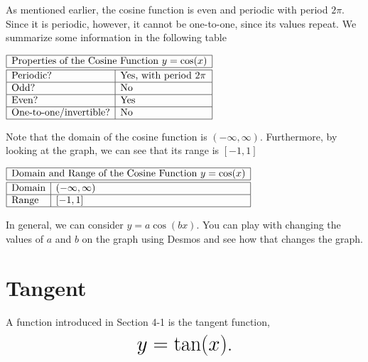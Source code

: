 \documentclass[nooutcomes]{ximera}
\begin{document}
As mentioned earlier, the cosine function is even and periodic with period $2\pi$. Since it is periodic, however, it cannot be one-to-one, since its values repeat. We summarize some information in the following table

\begin{center}
$
\begin{array}{|l|l|}
 \hline
 \multicolumn{2}{|c|}{\text{\normalfont Properties of the Cosine Function } y=\cos(x)} \\
\hline
 \hline
\text{Periodic?} & \text{Yes, with period }2\pi \\ \hline
\text{Odd?} & \text{No} \\ \hline
\text{Even?} & \text{Yes} \\ \hline
\text{One-to-one/invertible?} & \text{No} \\ \hline
\end{array}
$
\end{center}


Note that the domain of the cosine function is $(-\infty, \infty)$. Furthermore, by looking at the graph, we can see that its range is $[-1, 1]$

\begin{center}
$
\begin{array}{|l|l|}
 \hline
 \multicolumn{2}{|c|}{\text{\normalfont Domain and Range of the Cosine Function } y=\cos(x)} \\
\hline
 \hline
\text{Domain} & (-\infty, \infty) \\ \hline
\text{Range} & [-1, 1] \\ \hline
\end{array}
$
\end{center}
In general, we can consider $y=a\cos(bx)$.  You can play with changing the values of $a$ and $b$ on the graph using Desmos and see how that changes the graph.  

\begin{center}  
\end{center}

\newpage


\section{Tangent}
A function introduced in Section 4-1 is the tangent function, $$ \mbox{\huge $y=\tan(x)$.}$$ 
\end{document}
